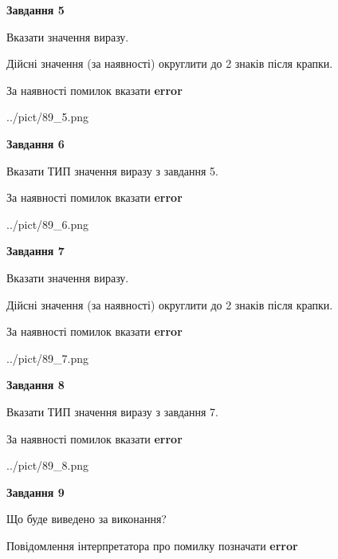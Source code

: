 \documentclass[11pt, ukrainian]{article}
\begin{document}
{\begin {large}
{\begin {center}\textbf{Завдання 5}\end {center}}\par
Вказати значення виразу. \par
Дійсні значення (за наявності) округлити до 2 знаків після крапки. \par
За наявності помилок вказати \textbf{error}

\begin{center}
	{../pict/89_5.png}
\end{center}
\newpage

{\begin {center}\textbf{Завдання 6}\end {center}}\par
Вказати ТИП значення виразу з завдання 5. \par
За наявності помилок вказати \textbf{error}

\begin{center}
	{../pict/89_6.png}
\end{center}
\newpage

{\begin {center}\textbf{Завдання 7}\end {center}}\par
Вказати значення виразу. \par
Дійсні значення (за наявності) округлити до 2 знаків після крапки. \par
За наявності помилок вказати \textbf{error}

\begin{center}
	{../pict/89_7.png}
\end{center}
\newpage

{\begin {center}\textbf{Завдання 8}\end {center}}\par
Вказати ТИП значення виразу з завдання 7. \par
За наявності помилок вказати \textbf{error}

\begin{center}
	{../pict/89_8.png}
\end{center}
\newpage

{\begin {center}\textbf{Завдання 9}\end {center}}\par
Що буде виведено за виконання? \par
Повідомлення інтерпретатора про помилку позначати \textbf{error}


\end{large}}
\end{document}
